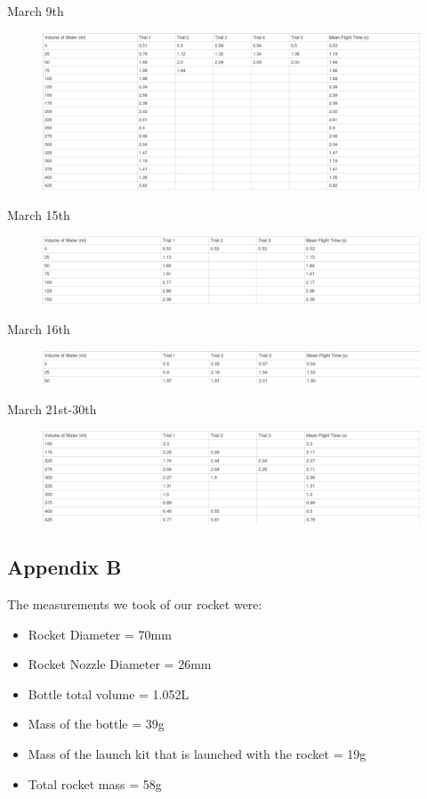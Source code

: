 \documentclass[14pt]{article}
\begin{document}
March 9th

\begin{figure}[h]
    \centering
    \includegraphics[width=\textwidth]{data/9th.png}
\end{figure}
\FloatBarrier
March 15th

\begin{figure}[h]
    \centering
    \includegraphics[width=\textwidth]{data/15th.png}
\end{figure}
\FloatBarrier
March 16th

\begin{figure}[h]
    \centering
    \includegraphics[width=\textwidth]{data/16th.png}
\end{figure}
\FloatBarrier

March 21st-30th

\begin{figure}[h]
    \centering
    \includegraphics[width=\textwidth]{data/21st-30th.png}
\end{figure}
\FloatBarrier


\subsection{Appendix B}
\label {Appendix B}
The measurements we took of our rocket were:
\begin{itemize}
    \item Rocket Diameter = 70mm
    \item Rocket Nozzle Diameter = 26mm
    \item Bottle total volume = 1.052L
    \item Mass of the bottle = 39g
    \item Mass of the launch kit that is launched with the rocket = 19g
    \item Total rocket mass = 58g
\end{itemize}
\end{document}
